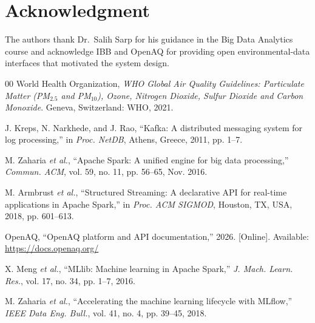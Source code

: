 \documentclass[12pt,a4paper]{article}
\begin{document}
\section*{Acknowledgment}
The authors thank Dr.\ Salih Sarp for his guidance in the Big Data Analytics
course and acknowledge IBB and OpenAQ for providing open environmental-data
interfaces that motivated the system design.

\begin{thebibliography}{00}
World Health Organization, \emph{WHO Global Air Quality Guidelines:
Particulate Matter (PM$_{2.5}$ and PM$_{10}$), Ozone, Nitrogen Dioxide,
Sulfur Dioxide and Carbon Monoxide}. Geneva, Switzerland: WHO, 2021.

J. Kreps, N. Narkhede, and J. Rao, ``Kafka: A distributed messaging system
for log processing,'' in \emph{Proc. NetDB}, Athens, Greece, 2011, pp. 1--7.

M. Zaharia \emph{et al.}, ``Apache Spark: A unified engine for big data
processing,'' \emph{Commun. ACM}, vol. 59, no. 11, pp. 56--65, Nov. 2016.

M. Armbrust \emph{et al.}, ``Structured Streaming: A declarative API for
real-time applications in Apache Spark,'' in \emph{Proc. ACM SIGMOD},
Houston, TX, USA, 2018, pp. 601--613.

OpenAQ, ``OpenAQ platform and API documentation,'' 2026. [Online].
Available: \url{https://docs.openaq.org/}

X. Meng \emph{et al.}, ``MLlib: Machine learning in Apache Spark,''
\emph{J. Mach. Learn. Res.}, vol. 17, no. 34, pp. 1--7, 2016.

M. Zaharia \emph{et al.}, ``Accelerating the machine learning lifecycle with
MLflow,'' \emph{IEEE Data Eng. Bull.}, vol. 41, no. 4, pp. 39--45, 2018.
\end{thebibliography}
\end{document}
